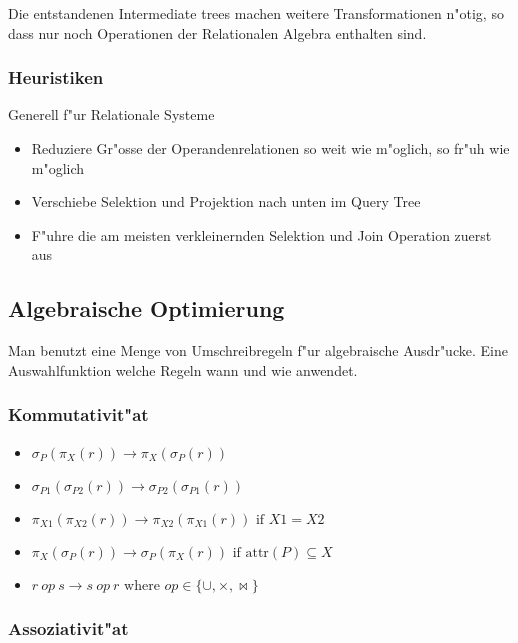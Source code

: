 \documentclass[german, 10pt, a4paper, twocolumn]{scrartcl}
\theoremstyle{definition}
\theoremstyle{remark}
\theoremstyle{example}
\begin{document}
Die entstandenen Intermediate trees machen weitere Transformationen n"otig, so dass nur noch Operationen der Relationalen Algebra enthalten sind.

\subsubsection{Heuristiken}

Generell f"ur Relationale Systeme
\begin{itemize}
	\item Reduziere Gr"osse der Operandenrelationen so weit wie m"oglich, so fr"uh wie m"oglich
	\item Verschiebe Selektion und Projektion nach unten im Query Tree
	\item F"uhre die am meisten verkleinernden Selektion und Join Operation zuerst aus
\end{itemize}

\subsection{Algebraische Optimierung}

Man benutzt eine Menge von Umschreibregeln f"ur algebraische Ausdr"ucke. Eine Auswahlfunktion welche Regeln wann und wie anwendet.

\subsubsection{Kommutativit"at}

\begin{itemize}
	\item $\sigma_P (\pi_X (r)) \rightarrow \pi_X (\sigma_P (r))$
	\item $\sigma_{P1}(\sigma_{P2}(r)) \rightarrow \sigma_{P2} (\sigma_{P1} (r))$
	\item $\pi_{X1}(\pi_{X2}(r)) \rightarrow \pi_{X2}(\pi_{X1}(r)) \mbox{ if } X1 = X2$
	\item $\pi_{X}(\sigma_{P}(r)) \rightarrow \sigma_P (\pi_X (r)) \mbox{ if attr}(P) \subseteq X$
	\item $r \ op \ s \rightarrow s \ op \ r \mbox{ where } op \in \{ \cup, \times, \bowtie \}$
\end{itemize}

\subsubsection{Assoziativit"at}
\end{document}
